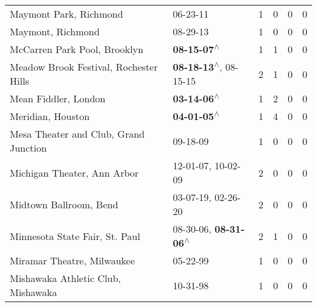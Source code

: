 \begin{supertabular}{p{0.4\textwidth}p{0.3\textwidth}p{0.05\textwidth}p{0.05\textwidth}p{0.05\textwidth}p{0.05\textwidth}}
                                                       Maymont Park, Richmond &                                                                  06-23-11\textsuperscript{} &  1 &  0 &  0 &  0 \\
                                                            Maymont, Richmond &                                                                  08-29-13\textsuperscript{} &  1 &  0 &  0 &  0 \\
                                                 McCarren Park Pool, Brooklyn &                                                 \textbf{08-15-07\textsuperscript{$\wedge$}} &  1 &  1 &  0 &  0 \\
                                       Meadow Brook Festival, Rochester Hills &                     \textbf{08-18-13\textsuperscript{$\wedge$}}, 08-15-15\textsuperscript{} &  2 &  1 &  0 &  0 \\
                                                         Mean Fiddler, London &                                                 \textbf{03-14-06\textsuperscript{$\wedge$}} &  1 &  2 &  0 &  0 \\
                                                            Meridian, Houston &                                                 \textbf{04-01-05\textsuperscript{$\wedge$}} &  1 &  4 &  0 &  0 \\
                                        Mesa Theater and Club, Grand Junction &                                                                  09-18-09\textsuperscript{} &  1 &  0 &  0 &  0 \\
                                                  Michigan Theater, Ann Arbor &                                      12-01-07\textsuperscript{}, 10-02-09\textsuperscript{} &  2 &  0 &  0 &  0 \\
                                                       Midtown Ballroom, Bend &                                      03-07-19\textsuperscript{}, 02-26-20\textsuperscript{} &  2 &  0 &  0 &  0 \\
                                               Minnesota State Fair, St. Paul &                     08-30-06\textsuperscript{}, \textbf{08-31-06\textsuperscript{$\wedge$}} &  2 &  1 &  0 &  0 \\
                                                   Miramar Theatre, Milwaukee &                                                                  05-22-99\textsuperscript{} &  1 &  0 &  0 &  0 \\
                                           Mishawaka Athletic Club, Mishawaka &                                                                  10-31-98\textsuperscript{} &  1 &  0 &  0 &  0 \\

\end{supertabular}
